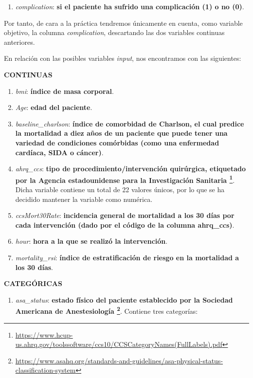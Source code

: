 \documentclass[
]{article}
\providecommand{\tightlist}{%
  \setlength{\itemsep}{0pt}\setlength{\parskip}{0pt}}
\begin{document}
\begin{enumerate}
\def\labelenumi{\arabic{enumi}.}
\setcounter{enumi}{2}
\tightlist
\item
  \emph{complication}: \textbf{si el paciente ha sufrido una
  complicación (1) o no (0)}.
\end{enumerate}

Por tanto, de cara a la práctica tendremos únicamente en cuenta, como
variable objetivo, la columna \emph{complication}, descartando las dos
variables continuas anteriores.

En relación con las posibles variables \emph{input}, nos encontramos con
las siguientes:

\textbf{CONTINUAS}

\begin{enumerate}
\def\labelenumi{\arabic{enumi}.}
\item
  \emph{bmi}: \textbf{índice de masa corporal}.
\item
  \emph{Age}: \textbf{edad del paciente}.
\item
  \emph{baseline\_charlson}: \textbf{índice de comorbidad de Charlson,
  el cual predice la mortalidad a diez años de un paciente que puede
  tener una variedad de condiciones comórbidas (como una enfermedad
  cardíaca, SIDA o cáncer)}.
\item
  \emph{ahrq\_ccs}: \textbf{tipo de procedimiento/intervención
  quirúrgica, etiquetado por la Agencia estadounidense para la
  Investigación Sanitaria \footnote{\url{https://www.hcup-us.ahrq.gov/toolssoftware/ccs10/CCSCategoryNames(FullLabels).pdf}}}.
  Dicha variable contiene un total de 22 valores únicos, por lo que se
  ha decidido mantener la variable como numérica.
\item
  \emph{ccsMort30Rate}: \textbf{incidencia general de mortalidad a los
  30 días por cada intervención (dado por el código de la columna
  ahrq\_ccs)}.
\item
  \emph{hour}: \textbf{hora a la que se realizó la intervención}.
\item
  \emph{mortality\_rsi}: \textbf{índice de estratificación de riesgo en
  la mortalidad a los 30 días}.
\end{enumerate}

\textbf{CATEGÓRICAS}

\begin{enumerate}
\def\labelenumi{\arabic{enumi}.}
\setcounter{enumi}{7}
\tightlist
\item
  \emph{asa\_status}: \textbf{estado físico del paciente establecido por
  la Sociedad Americana de Anestesiología \footnote{\url{https://www.asahq.org/standards-and-guidelines/asa-physical-status-classification-system}}}.
  Contiene tres categorías:
\end{enumerate}
\end{document}
